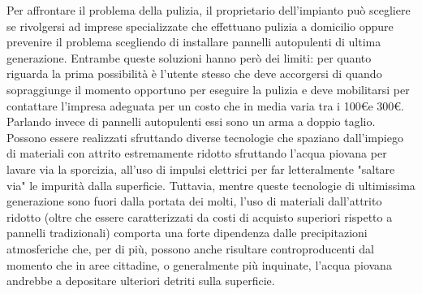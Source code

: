 \documentclass[a4paper, 12pt]{article}
\begin{document}
	Per affrontare il problema della pulizia, il proprietario dell'impianto può scegliere se rivolgersi ad imprese specializzate che effettuano pulizia a domicilio oppure prevenire il problema scegliendo di installare pannelli autopulenti di ultima generazione. Entrambe queste soluzioni hanno però dei limiti: per quanto riguarda la prima possibilità è l'utente stesso che deve accorgersi di quando sopraggiunge il momento opportuno per eseguire la pulizia e deve mobilitarsi per contattare l'impresa adeguata per un costo che in media varia tra i 100\euro e 300\euro.\\
	Parlando invece di pannelli autopulenti essi sono un arma a doppio taglio.\\
 Possono essere realizzati sfruttando diverse tecnologie che spaziano dall'impiego di materiali con attrito estremamente ridotto sfruttando l'acqua piovana per lavare via la sporcizia, all'uso di impulsi elettrici per far letteralmente "saltare via" le impurità dalla superficie. Tuttavia, mentre queste tecnologie di ultimissima generazione sono fuori dalla portata dei molti, l'uso di materiali dall'attrito ridotto (oltre che essere caratterizzati da costi di acquisto superiori rispetto  a pannelli tradizionali) comporta una forte dipendenza dalle precipitazioni atmosferiche che, per di più, possono anche risultare controproducenti dal momento che in aree cittadine, o generalmente più inquinate, l'acqua piovana andrebbe a depositare ulteriori detriti sulla superficie.\\
\end{document}
